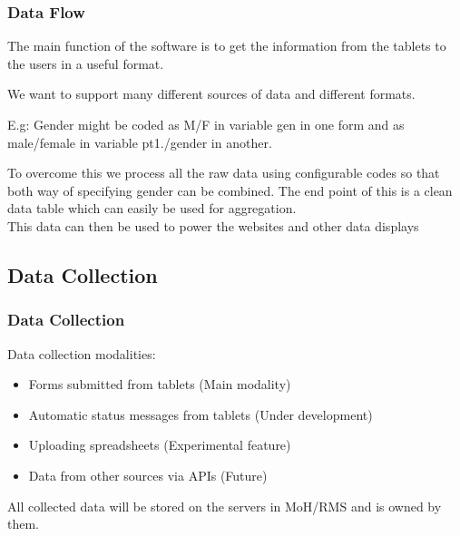 \documentclass{beamer}
\begin{document}
\begin{frame}
  \frametitle{Data Flow}
  The main function of the software is to get the information from the tablets to the users in a useful format. \\
  \vspace{10pt}

  We want to support many different sources of data and different formats. \\

    \vspace{10pt}
  
  E.g: Gender might be coded as M/F in variable gen in one form and as male/female in variable pt1./gender in another. \\

    \vspace{10pt}
  
    To overcome this we process all the raw data using configurable codes so that both way of specifying gender can be combined. The end point of this is a clean data table which can easily be used for aggregation. \\

    \vspace{10pt}
    This data can then be used to power the websites and other data displays

    
  \end{frame}


\subsection{Data Collection}

\begin{frame}
  \frametitle{Data Collection}
  Data collection modalities:
  \begin{itemize}
  \item Forms submitted from tablets (Main modality)
  \item Automatic status messages from tablets (Under development)
  \item Uploading spreadsheets (Experimental feature)
  \item Data from other sources via APIs (Future)
  \end{itemize}

  \vspace{10pt}
  All collected data will be stored on the servers in MoH/RMS and is owned by them. 
\end{frame}
\end{document}
